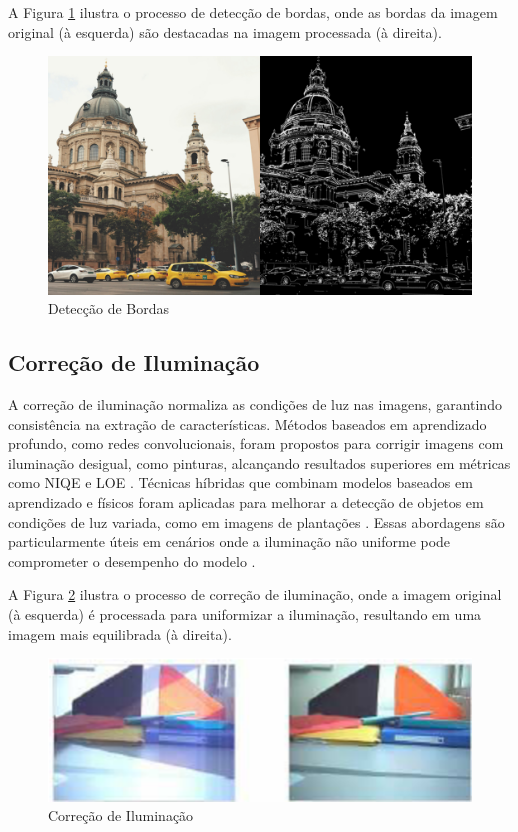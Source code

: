 A Figura \ref{fig:deteccao_de_bordas} ilustra o processo de detecção de bordas, onde as bordas da imagem original (à esquerda) são destacadas na imagem processada (à direita).

\begin{figure}[H]
    \centering
    \caption{\label{fig:deteccao_de_bordas}Detecção de Bordas}
    \includegraphics[width=1\textwidth]{img/revisao_bibliografica/deteccao_de_bordas.png}
\end{figure}

\subsection{Correção de Iluminação}
A correção de iluminação normaliza as condições de luz nas imagens, garantindo consistência na extração de características. Métodos baseados em aprendizado profundo, como redes convolucionais, foram propostos para corrigir imagens com iluminação desigual, como pinturas, alcançando resultados superiores em métricas como NIQE e LOE \cite{li2020simple}. Técnicas híbridas que combinam modelos baseados em aprendizado e físicos foram aplicadas para melhorar a detecção de objetos em condições de luz variada, como em imagens de plantações \cite{yang2022using}. Essas abordagens são particularmente úteis em cenários onde a iluminação não uniforme pode comprometer o desempenho do modelo \cite{li2020simple}.

A Figura \ref{fig:correcao_de_iluminacao} ilustra o processo de correção de iluminação, onde a imagem original (à esquerda) é processada para uniformizar a iluminação, resultando em uma imagem mais equilibrada (à direita).

\begin{figure}[H]
    \centering
    \caption{\label{fig:correcao_de_iluminacao}Correção de Iluminação}
    \includegraphics[width=1\textwidth]{img/revisao_bibliografica/correcao_de_iluminacao.png}
\end{figure}


